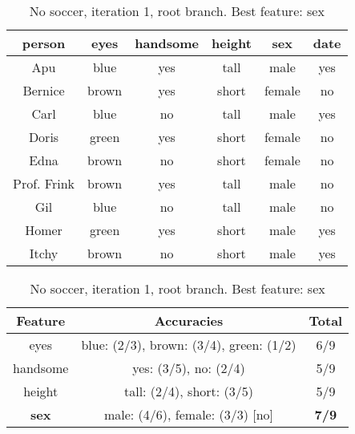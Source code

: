 \begin{table}[h!]
  \centering
  \begin{tabular}{ccccc|c}
    \toprule
    person      & eyes  & handsome & height & sex    & date\\
    \midrule
    Apu         & blue  & yes      & tall   & male   & yes \\
    Bernice     & brown & yes      & short  & female & no  \\
    Carl        & blue  & no       & tall   & male   & yes \\
    Doris       & green & yes      & short  & female & no  \\
    Edna        & brown & no       & short  & female & no  \\
    Prof. Frink & brown & yes      & tall   & male   & no  \\
    Gil         & blue  & no       & tall   & male   & no  \\
    Homer       & green & yes      & short  & male   & yes \\
    Itchy       & brown & no       & short  & male   & yes \\
    \bottomrule
  \end{tabular}

  \vspace{.5cm}

  \begin{tabular}{ccc}
    \toprule
    Feature      & Accuracies                              & Total\\
    \midrule
    eyes         & blue: (2/3), brown: (3/4), green: (1/2) & 6/9\\
    handsome     & yes: (3/5), no: (2/4)                   & 5/9\\
    height       & tall: (2/4), short: (3/5)               & 5/9\\
    \textbf{sex} & male: (4/6), female: (3/3) [no]         & \textbf{7/9}\\
    \bottomrule
  \end{tabular}
  \caption*{No soccer, iteration 1, root branch. Best feature: sex}
\end{table}

